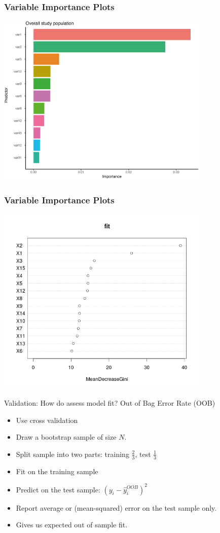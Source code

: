 \documentclass[xcolor=pdftex,dvipsnames,table,mathserif]{beamer}
\begin{document}
\begin{frame}
\frametitle{Variable Importance Plots}
\includegraphics[width=4in]{./resources/Importance.jpg}
\end{frame}

\begin{frame}
\frametitle{Variable Importance Plots}
\includegraphics[width=4in]{./resources/variable-importance.png}
\end{frame}


\begin{frame}{Validation: How do assess model fit?}
Out of Bag Error Rate (OOB)
\begin{itemize}
\item Use \alert{cross validation}
\item Draw a bootstrap sample of size $N$.
\item Split sample into two parts: training $\frac{2}{3}$, test $\frac{1}{3}$
\item Fit on the training sample
\item Predict on the test sample: $(y_i - \hat{y}_i^{OOB})^2$
\item Report average or (mean-squared) error on the test sample only.
\item Gives us expected out of sample fit.
\end{itemize}
\end{frame}
\end{document}

